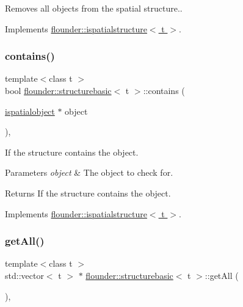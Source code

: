 Removes all objects from the spatial structure.. 



Implements \hyperlink{classflounder_1_1ispatialstructure_a422fac0231ea3095e2f85951259a4686}{flounder\+::ispatialstructure$<$ t $>$}.

\mbox{\label{classflounder_1_1structurebasic_ac9a9bcd40d564056c33c2ade540f4e4c}} 
\subsubsection{\texorpdfstring{contains()}{contains()}}
{\footnotesize\ttfamily template$<$class t $>$ \\
bool \hyperlink{classflounder_1_1structurebasic}{flounder\+::structurebasic}$<$ t $>$\+::contains (\begin{DoxyParamCaption}\item[{\hyperlink{classflounder_1_1ispatialobject}{ispatialobject} $\ast$}]{object }\end{DoxyParamCaption})\hspace{0.3cm}{\ttfamily [override]}, {\ttfamily [virtual]}}



If the structure contains the object. 


\begin{DoxyParams}{Parameters}
{\em object} & The object to check for. \\
\hline
\end{DoxyParams}
\begin{DoxyReturn}{Returns}
If the structure contains the object. 
\end{DoxyReturn}


Implements \hyperlink{classflounder_1_1ispatialstructure_a80e36c5dca0995c27d7222e3c3fc1b90}{flounder\+::ispatialstructure$<$ t $>$}.

\mbox{\label{classflounder_1_1structurebasic_a77aa32807b5d3b901a6184cf6af81073}} 
\subsubsection{\texorpdfstring{get\+All()}{getAll()}\hspace{0.1cm}{\footnotesize\ttfamily [1/2]}}
{\footnotesize\ttfamily template$<$class t $>$ \\
std\+::vector$<$ t $>$ $\ast$ \hyperlink{classflounder_1_1structurebasic}{flounder\+::structurebasic}$<$ t $>$\+::get\+All (\begin{DoxyParamCaption}{ }\end{DoxyParamCaption})\hspace{0.3cm}{\ttfamily [override]}, {\ttfamily [virtual]}}



